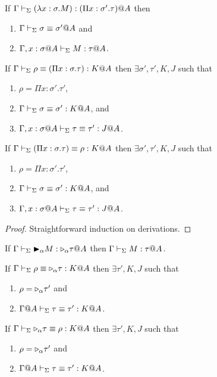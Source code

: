 \begin{lemma}
	If $\Gamma \vdash_\Sigma (\lambda x:\sigma.M) : (\Pi x:\sigma'.\tau)@A$ then
	\begin{enumerate}
		\item $\Gamma \vdash_\Sigma \sigma \equiv \sigma'@A$ and
		\item $\G ,x:\sigma@A\V M:\tau @A$.
	\end{enumerate}
	\item If $\Gamma \vdash_\Sigma \rho \equiv (\Pi x:\sigma.\tau) : K @A$ then $\exists \sigma', \tau', K, J$ such that
	\begin{enumerate}
		\item $\rho = \Pi x:\sigma'.\tau'$,
		\item $\Gamma \vdash_\Sigma \sigma \equiv \sigma' : K @A$, and
		\item $\G, x:\sigma@A\V \tau \E \tau' : J @A$.
	\end{enumerate}
	\item If $\Gamma \vdash_\Sigma (\Pi x:\sigma.\tau) \equiv \rho : K @A$ then $\exists \sigma', \tau', K, J$ such that
	\begin{enumerate}
		\item $\rho = \Pi x:\sigma'.\tau'$,
		\item $\Gamma \vdash_\Sigma \sigma \equiv \sigma' : K @A$, and
		\item $\G, x:\sigma@A\V \tau \E \tau' : J @A$.
	\end{enumerate}
\end{lemma}

\begin{proof}
	Straightforward induction on derivations.
\end{proof}

\begin{theorem}
	\begin{item}
	      \item If $\Gamma \vdash_\Sigma {\mathop{\blacktriangleright}}_\alpha M : {\mathop{\triangleright}}_\alpha \tau @A$ then $\Gamma \vdash_\Sigma M : \tau @A$.
	      \item If $\Gamma \vdash_\Sigma \rho \equiv  {\mathop{\triangleright}}_\alpha \tau : K @A$ then $\exists \tau', K, J$ such that
	      \begin{enumerate}
		      \item $\rho = {\mathop{\triangleright}}_\alpha \tau'$ and
		      \item $\Gamma @A\vdash_\Sigma \tau \equiv \tau' : K @A$.
	      \end{enumerate}
	      \item If $\Gamma \vdash_\Sigma {\mathop{\triangleright}}_\alpha \tau \equiv \rho : K @A$ then $\exists \tau', K, J$ such that
	      \begin{enumerate}
		      \item $\rho = {\mathop{\triangleright}}_\alpha \tau'$ and
		      \item $\Gamma @A\vdash_\Sigma \tau \equiv \tau' : K @A$.
	      \end{enumerate}
	\end{item}
\end{theorem}


